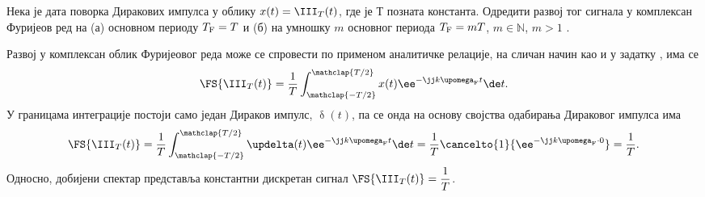 \PID \label{z:dirak_povorka} \mnImportant
Нека је дата поворка Диракових импулса у облику $x(t) = \III_T(t)$, где је $Т$ позната константа. 
Одредити развој тог сигнала у комплексан Фуријеов ред 
на (а) основном периоду $T_{\rm F} = T$  и (б) на умношку $m$ основног периода $T_{\rm F} = mT$, $m \in \mathbb N$, $m > 1$ .

\RESENJE
Развој у комплексан облик Фуријеовог реда  може се спровести по применом аналитичке релације, на сличан начин као и у 
задатку , има се 
\begin{eqnarray}
    \FS{\III_{T}(t)} = \dfrac{1}{T} 
    \int_{\mathclap{-T/2}}^{\mathclap{T/2}} x(t) \ee^{-\jj k \upomega_{\rm F} t} \de t. \label{\ID.e1}
\end{eqnarray}
У границама интеграције постоји само један Дираков импулс, $\updelta(t)$, па се онда на основу 
својства одабирања Дираковог импулса има 
\begin{eqnarray}
    \FS{\III_{T}(t)} = \dfrac{1}{T} 
    \int_{\mathclap{-T/2}}^{\mathclap{T/2}} \updelta(t) \ee^{-\jj k \upomega_{\rm F} t} \de t = 
     \dfrac{1}{T} \cancelto{1}{\ee^{-\jj k \upomega_{\rm F} \cdot 0}} = \dfrac{1}{T}.
\end{eqnarray}
Односно, добијени спектар представља константни дискретан сигнал $\FS{\III_{T}(t)} = \dfrac{1}{T}$. 

